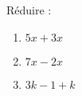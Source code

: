 
\begin{mental}
    Réduire :
    \begin{enumerate}
        \item
            \( 5x+3x\)
        \item
            \( 7x-2x\)
        \item
            \( 3k-1+k\)
    \end{enumerate}
\end{mental}
